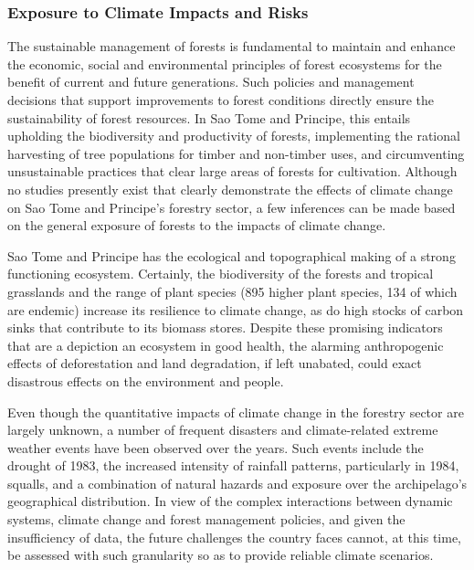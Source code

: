 \documentclass[
]{book}
\begin{document}
\hypertarget{exposure-to-climate-impacts-and-risks-15}{%
\subsubsection{Exposure to Climate Impacts and Risks}\label{exposure-to-climate-impacts-and-risks-15}}

The sustainable management of forests is fundamental to maintain and enhance the economic, social and environmental principles of forest ecosystems for the benefit of current and future generations. Such policies and management decisions that support improvements to forest conditions directly ensure the sustainability of forest resources. In Sao Tome and Principe, this entails upholding the biodiversity and productivity of forests, implementing the rational harvesting of tree populations for timber and non-timber uses, and circumventing unsustainable practices that clear large areas of forests for cultivation. Although no studies presently exist that clearly demonstrate the effects of climate change on Sao Tome and Principe's forestry sector, a few inferences can be made based on the general exposure of forests to the impacts of climate change.

Sao Tome and Principe has the ecological and topographical making of a strong functioning ecosystem. Certainly, the biodiversity of the forests and tropical grasslands and the range of plant species (895 higher plant species, 134 of which are endemic) increase its resilience to climate change, as do high stocks of carbon sinks that contribute to its biomass stores. Despite these promising indicators that are a depiction an ecosystem in good health, the alarming anthropogenic effects of deforestation and land degradation, if left unabated, could exact disastrous effects on the environment and people.

Even though the quantitative impacts of climate change in the forestry sector are largely unknown, a number of frequent disasters and climate-related extreme weather events have been observed over the years. Such events include the drought of 1983, the increased intensity of rainfall patterns, particularly in 1984, squalls, and a combination of natural hazards and exposure over the archipelago's geographical distribution. In view of the complex interactions between dynamic systems, climate change and forest management policies, and given the insufficiency of data, the future challenges the country faces cannot, at this time, be assessed with such granularity so as to provide reliable climate scenarios.
\end{document}
